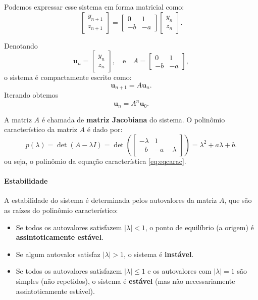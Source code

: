 \documentclass{article}
\begin{document}
Podemos expressar esse sistema em forma matricial como:
\begin{equation}
\begin{bmatrix}
y_{n+1} \\
z_{n+1}
\end{bmatrix}
=
\begin{bmatrix}
0 & 1 \\
-b & -a
\end{bmatrix}
\begin{bmatrix}
y_n \\
z_n
\end{bmatrix}.
\end{equation}

Denotando
\[
\bm{u}_n = \begin{bmatrix} y_n \\ z_n \end{bmatrix},
\quad \text{e} \quad
A = \begin{bmatrix} 0 & 1 \\ -b & -a \end{bmatrix},
\]
o sistema é compactamente escrito como:
\[
\bm{u}_{n+1} = A \bm{u}_n.
\]
Iterando obtemos \[\bm{u}_{n} = A^n \bm{u}_0.\]

A matriz $A$ é chamada de \textbf{matriz Jacobiana} do sistema. O
polinômio característico da matriz $A$ é dado por:
\begin{equation}
p(\lambda) = \det(A - \lambda I) = 
\det\left(
\begin{bmatrix}
-\lambda & 1 \\
-b & -a-\lambda
\end{bmatrix}
\right) =\lambda^2 +a\lambda +b.
\end{equation}
ou seja, o polinômio da equação característica \eqref{eq:eqcarac}.

\paragraph{Estabilidade} A estabilidade do sistema é determinada pelos
autovalores da matriz $A$, que são as raízes do polinômio
característico:
\begin{itemize}
\item Se todos os autovalores satisfazem $|\lambda| < 1$, o ponto de
  equilíbrio (a origem) é \textbf{assintoticamente estável}.
\item Se algum autovalor satisfaz $|\lambda| > 1$, o sistema é
  \textbf{instável}.
\item Se todos os autovalores satisfazem $|\lambda| \leq 1$ e os
  autovalores com $|\lambda| = 1$ são simples (não repetidos), o
  sistema é \textbf{estável} (mas não necessariamente assintoticamente
  estável).
\end{itemize}
\end{document}
